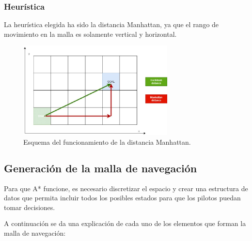 \subsubsection{Heurística}




La heurística elegida ha sido la distancia Manhattan, ya que el rango de movimiento en la malla es solamente vertical y horizontal.

\begin{figure}[H]
    \centering
    \includegraphics[width=0.7\textwidth]{imagenes/converted/Euclidean-and-Manhattan-distance-comparison-3235-Optimizations-The-first-optimization.jpg}
    \caption{Esquema del funcionamiento de la distancia Manhattan\cite{gameai}.}
    \label{fig:manhattan}
\end{figure}


\subsection{Generación de la malla de navegación}
Para que A* funcione, es necesario discretizar el espacio y crear una estructura de datos que permita incluir todos los posibles estados para que los pilotos puedan tomar decisiones.

\bigskip

A continuación se da una explicación de cada uno de los elementos que forman la malla de navegación:

